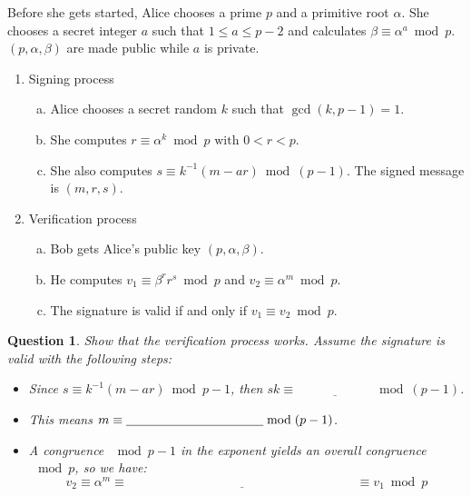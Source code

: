 \documentclass[12pt]{amsart}
\theoremstyle{plain}
\newtheorem{quest}{Question}
\theoremstyle{definition}
\theoremstyle{remark}
\begin{document}
\begin{framed}
Before she gets started, Alice chooses a prime $p$ and a primitive root $\alpha$.  She chooses a secret integer $a$ such that $1 \leq a \leq p-2$ and calculates $\beta \equiv \alpha^a \bmod p$.  $(p, \alpha, \beta)$ are made public while $a$ is private.
\begin{enumerate}[1.]
	\item Signing process
		\begin{enumerate}[a.]
			\item Alice chooses a secret random $k$ such that $\gcd(k,p-1) = 1$.
			\item She computes $r \equiv \alpha^k \bmod p \text{ with } 0 < r < p$.
			\item She also computes $s \equiv k^{-1}(m-ar) \bmod (p-1).$  The signed message is $(m,r,s)$.
		\end{enumerate}
	\item Verification process
	\begin{enumerate}[a.]
		\item Bob gets Alice's public key $(p, \alpha, \beta)$.
		\item He computes $v_1 \equiv \beta^r r^s \bmod p$ and $v_2 \equiv \alpha^m \bmod p$.
		\item The signature is valid if and only if $v_1 \equiv v_2 \bmod p$.
	\end{enumerate}
\end{enumerate}
\end{framed}

\begin{quest}
Show that the verification process works.  Assume the signature is valid with the following steps:\\
\begin{itemize}
	\item Since $s \equiv k^{-1}(m-ar) \bmod p-1$, then $sk \equiv \underline{\hspace{1in}} \bmod (p-1)$.\\
	\item This means $m \equiv  \underline{\hspace{1.5in}} \bmod (p-1)$.\\
	\item A congruence $\mod p-1$ in the exponent yields an overall congruence $\mod p$, so we have:
		$$v_2 \equiv \alpha^m \equiv  \underline{\hspace{3in}} \equiv v_1 \bmod p$$
\end{itemize}
\end{quest}
\end{document}
